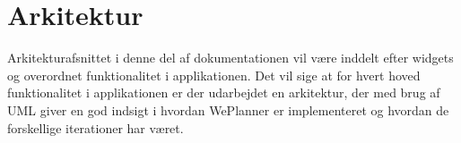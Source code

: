 \section{Arkitektur}

Arkitekturafsnittet i denne del af dokumentationen vil være inddelt efter widgets og overordnet funktionalitet i applikationen. Det vil sige at for hvert hoved funktionalitet i applikationen er der udarbejdet en arkitektur, der med brug af UML giver en god indsigt i hvordan WePlanner er implementeret og hvordan de forskellige iterationer har været.


